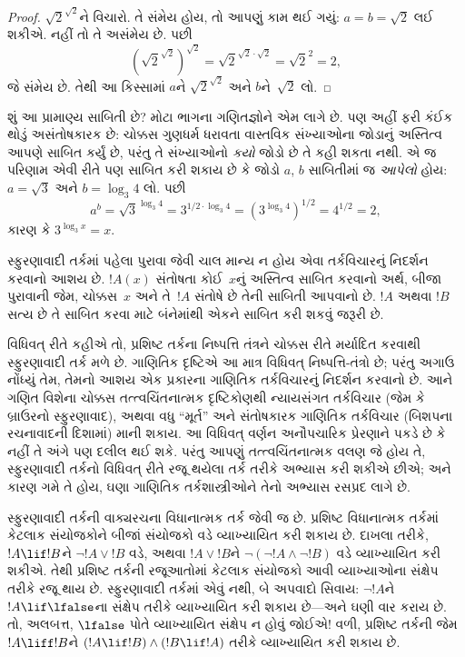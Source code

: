 \begin{proof}
$\sqrt{2}^{\sqrt{2}}$ને વિચારો. તે સંમેય હોય, તો આપણું કામ
થઈ ગયું: $a = b = \sqrt{2}$ લઈ શકીએ. નહીં તો તે અસંમેય છે.
પછી
\[
(\sqrt{2}^{\sqrt{2}})^{\sqrt{2}} = \sqrt{2}^{\sqrt{2} \cdot
  \sqrt{2}} = \sqrt{2}^2 = 2,
\]
જે સંમેય છે. તેથી આ કિસ્સામાં $a$ને
$\sqrt{2}^{\sqrt{2}}$ અને $b$ને~$\sqrt 2$ લો.
\end{proof}

શું આ પ્રામાણ્ય સાબિતી છે? મોટા ભાગના ગણિતજ્ઞોને એમ લાગે છે.
પણ અહીં ફરી કંઈક થોડું અસંતોષકારક છે: ચોક્કસ ગુણધર્મ ધરાવતા
વાસ્તવિક સંખ્યાઓના જોડાનું અસ્તિત્વ આપણે સાબિત કર્યું છે,
પરંતુ તે સંખ્યાઓનો \emph{કયો} જોડો છે તે કહી શકતા નથી. એ જ
પરિણામ એવી રીતે પણ સાબિત કરી શકાય છે કે જોડો $a$, $b$
સાબિતીમાં જ \emph{આપેલો} હોય: $a = \sqrt{3}$ અને
$b = \log_3 4$ લો. પછી
\[
a^b = \sqrt{3}^{\log_3 4} = 3^{1/2 \cdot \log_3 4} = (3^{\log_3
  4})^{1/2} = 4^{1/2}= 2,
\]
કારણ કે $3^{\log_3 x} = x$.

સ્ફુરણાવાદી તર્કમાં પહેલા પુરાવા જેવી ચાલ માન્ય ન હોય એવા
તર્કવિચારનું નિદર્શન કરવાનો આશય છે. $!A(x)$ સંતોષતા કોઈ~$x$નું
અસ્તિત્વ સાબિત કરવાનો અર્થ, બીજા પુરાવાની જેમ, ચોક્કસ~$x$
અને તે~$!A$ સંતોષે છે તેની સાબિતી આપવાનો છે. $!A$ અથવા
$!B$ સત્ય છે તે સાબિત કરવા માટે બંનેમાંથી એકને સાબિત કરી
શકવું જરૂરી છે.

વિધિવત્ રીતે કહીએ તો, પ્રશિષ્ટ તર્કના નિષ્પત્તિ તંત્રને
ચોક્કસ રીતે મર્યાદિત કરવાથી સ્ફુરણાવાદી તર્ક મળે છે. ગાણિતિક
દૃષ્ટિએ આ માત્ર વિધિવત્ નિષ્પત્તિ-તંત્રો છે; પરંતુ અગાઉ
નોંધ્યું તેમ, તેમનો આશય એક પ્રકારના ગાણિતિક તર્કવિચારનું
નિદર્શન કરવાનો છે. આને ગણિત વિશેના ચોક્કસ તત્ત્વચિંતનાત્મક
દૃષ્ટિકોણથી ન્યાયસંગત તર્કવિચાર (જેમ કે બ્રાઉરનો સ્ફુરણાવાદ),
અથવા વધુ ``મૂર્ત'' અને સંતોષકારક ગાણિતિક તર્કવિચાર (બિશપના
રચનાવાદની દિશામાં) માની શકાય. આ વિધિવત્ વર્ણન અનૌપચારિક
પ્રેરણાને પકડે છે કે નહીં તે અંગે પણ દલીલ થઈ શકે. પરંતુ
આપણું તત્ત્વચિંતનાત્મક વલણ જે હોય તે, સ્ફુરણાવાદી તર્કનો
વિધિવત્ રીતે રજૂ થયેલા તર્ક તરીકે અભ્યાસ કરી શકીએ છીએ;
અને કારણ ગમે તે હોય, ઘણા ગાણિતિક તર્કશાસ્ત્રીઓને તેનો
અભ્યાસ રસપ્રદ લાગે છે.
\endgroup


\begingroup
\makeatletter{}\makeatother


\label{guunit:OLP-0494}


સ્ફુરણાવાદી તર્કની વાક્યરચના વિધાનાત્મક તર્ક જેવી જ છે.
પ્રશિષ્ટ વિધાનાત્મક તર્કમાં કેટલાક સંયોજકોને બીજાં સંયોજકો
વડે વ્યાખ્યાયિત કરી શકાય છે. દાખલા તરીકે, $!A \lif !B$ને
$\lnot !A \lor !B$ વડે, અથવા $!A \lor !B$ને
$\lnot(\lnot !A \land \lnot !B)$ વડે વ્યાખ્યાયિત કરી શકીએ.
તેથી પ્રશિષ્ટ તર્કની રજૂઆતોમાં કેટલાક સંયોજકો આવી વ્યાખ્યાઓના
સંક્ષેપ તરીકે રજૂ થાય છે. સ્ફુરણાવાદી તર્કમાં એવું નથી, બે
અપવાદો સિવાય: $\lnot !A$ને $!A \lif \lfalse$ના સંક્ષેપ
તરીકે વ્યાખ્યાયિત કરી શકાય છે---અને ઘણી વાર કરાય છે. તો,
અલબત્ત, $\lfalse$ પોતે વ્યાખ્યાયિત સંક્ષેપ ન હોવું જોઈએ!{}
વળી, પ્રશિષ્ટ તર્કની જેમ $!A \liff !B$ને
$(!A \lif !B) \land (!B \lif !A)$ તરીકે વ્યાખ્યાયિત કરી
શકાય છે.

